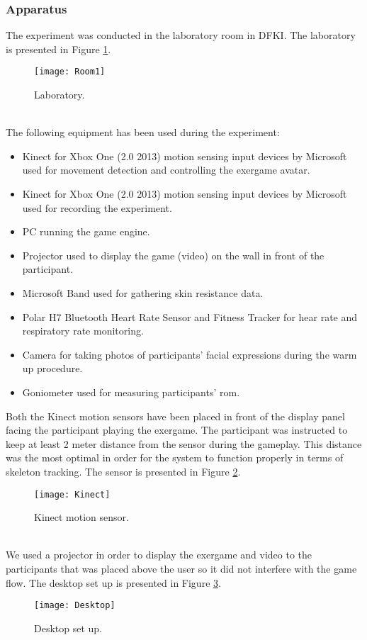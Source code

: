\subsubsection{Apparatus}
The experiment was conducted in the laboratory room in DFKI. The laboratory is presented in Figure \ref{fig:lab1}.\\ 
\begin{figure}[h]
    \centering
    \texttt{[image: Room1]}
    \caption{Laboratory.}
    \label{fig:lab1}
\end{figure}\\
The following equipment has been used during the experiment:
\begin{itemize}
\item Kinect for Xbox One (2.0 2013) motion sensing input devices by Microsoft used for movement detection and controlling the exergame avatar. 
\item Kinect for Xbox One (2.0 2013) motion sensing input devices by Microsoft used for recording the experiment. 
\item PC running the game engine.
\item Projector used to display the game (video) on the wall in front of the participant.
\item Microsoft Band used for gathering skin resistance data.
\item Polar H7 Bluetooth Heart Rate Sensor and Fitness Tracker for hear rate and respiratory rate monitoring.
\item Camera for taking photos of participants' facial expressions during the warm up procedure.
\item Goniometer used for measuring participants' \acrshort{rom}.
\end{itemize}\pagebreak
Both the Kinect motion sensors have been placed in front of the display panel facing the participant playing the exergame. The participant was instructed to keep at least 2 meter distance from the sensor during the gameplay. This distance was the most optimal in order for the system to function properly in terms of skeleton tracking. The sensor is presented in Figure \ref{fig:kinect}.\\
\begin{figure}[h]
    \centering
    \texttt{[image: Kinect]}
    \caption{Kinect motion sensor.}
    \label{fig:kinect}
\end{figure}\\
We used a projector in order to display the exergame and video to the participants that was placed above the user so it did not interfere with the game flow. The desktop set up is presented in Figure \ref{fig:desktop}.\\
\begin{figure}[h]
    \centering
    \texttt{[image: Desktop]}
    \caption{Desktop set up.}
    \label{fig:desktop}
\end{figure}
